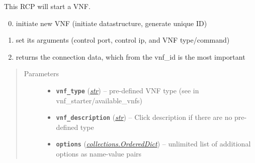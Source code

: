 \documentclass[letterpaper,10pt,english]{sphinxmanual}
\begin{document}
\begin{fulllineitems}

\begin{fulllineitems}
\label{adapt/domain_adapters:escape.adapt.domain_adapters.VNFStarterAdapter.__init__}
\end{fulllineitems}


\begin{fulllineitems}
\label{adapt/domain_adapters:escape.adapt.domain_adapters.VNFStarterAdapter.initiateVNF}
This RCP will start a VNF.
\begin{enumerate}
\setcounter{enumi}{-1}
\item {} 
initiate new VNF (initiate datastructure, generate unique ID)

\item {} 
set its arguments (control port, control ip, and VNF type/command)

\item {} 
returns the connection data, which from the vnf\_id is the most important

\end{enumerate}
\begin{quote}\begin{description}
\item[{Parameters}] \leavevmode\begin{itemize}
\item {} 
\textbf{\texttt{vnf\_type}} (\href{https://docs.python.org/2.7/library/functions.html\#str}{\emph{str}}) -- pre-defined VNF type (see in vnf\_starter/available\_vnfs)

\item {} 
\textbf{\texttt{vnf\_description}} (\href{https://docs.python.org/2.7/library/functions.html\#str}{\emph{str}}) -- Click description if there are no pre-defined type

\item {} 
\textbf{\texttt{options}} (\href{https://docs.python.org/2.7/library/collections.html\#collections.OrderedDict}{\emph{collections.OrderedDict}}) -- unlimited list of additional options as name-value pairs

\end{itemize}


\end{description}
\end{quote}
\end{fulllineitems}
\end{fulllineitems}
\end{document}
